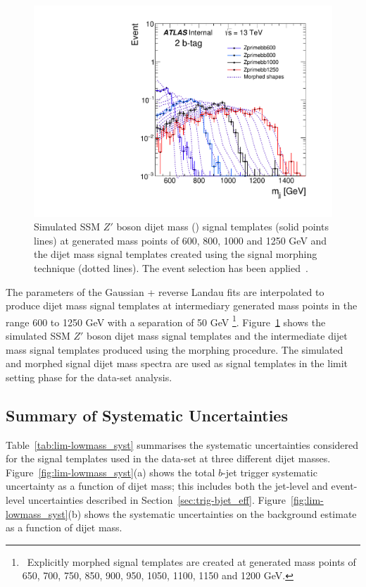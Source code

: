 \begin{figure}[!b]
  \vspace{-1.2em}
\begin{center}
  \includegraphics[width=0.47\linewidth, angle=0]{figs/Dibjet/LowMass/lim-morphing.pdf} 
\end{center}
\vspace{-2em}
\caption[Simulated SSM $Z'$ boson dijet mass signal templates and the intermediate dijet mass signal templates
  created using the signal morphing technique used in the \lm{} data-set limit setting phase.]
        {Simulated SSM $Z'$ boson dijet mass (\mjj) signal templates (solid points lines)
          at generated mass points of 600, 800, 1000 and 1250 GeV 
          and the dijet mass signal templates created using the signal morphing technique (dotted lines). The \lm{} event selection has been applied~\cite{dibjet-full_int}.
          \label{fig:lim-full_morphing}}
\end{figure}

The parameters of the Gaussian + reverse Landau fits are interpolated to produce dijet mass signal templates at intermediary generated mass points
in the range 600 to 1250 GeV with a separation of 50 GeV \footnote{\ Explicitly morphed signal templates are created at generated mass points of 650, 700, 750, 850, 900, 950, 1050, 1100, 1150 and 1200 GeV.}.
Figure~\ref{fig:lim-full_morphing} shows the simulated SSM $Z'$ boson dijet mass signal templates and the intermediate dijet mass signal templates produced using the morphing procedure.
The simulated and morphed signal dijet mass spectra are used as signal templates in the limit setting phase for the \lm{} data-set analysis.


\subsection{Summary of Systematic Uncertainties}
\label{sec:lim-full_systs}

Table~\ref{tab:lim-lowmass_syst} summarises the systematic uncertainties considered for the
signal templates used in the \lm{} data-set at three different dijet masses.
Figure~\ref{fig:lim-lowmass_syst}(a) shows the total $b$-jet trigger systematic uncertainty as a function of dijet  mass;
this includes both the jet-level and event-level uncertainties described in Section~\ref{sec:trig-bjet_eff}.
Figure~\ref{fig:lim-lowmass_syst}(b) shows the systematic uncertainties on the background estimate as a function of dijet  mass.

